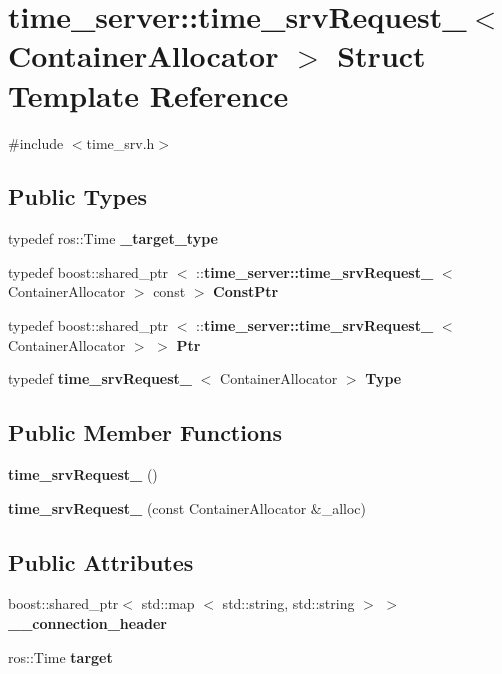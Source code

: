\section{time\-\_\-server\-:\-:time\-\_\-srv\-Request\-\_\-$<$ \-Container\-Allocator $>$ \-Struct \-Template \-Reference}
\label{structtime__server_1_1time__srvRequest__}


{\ttfamily \#include $<$time\-\_\-srv.\-h$>$}

\subsection*{\-Public \-Types}
\begin{DoxyCompactItemize}
\item 
typedef ros\-::\-Time {\bf \-\_\-target\-\_\-type}
\item 
typedef boost\-::shared\-\_\-ptr\*
$<$ \-::{\bf time\-\_\-server\-::time\-\_\-srv\-Request\-\_\-}\*
$<$ \-Container\-Allocator $>$ const  $>$ {\bf \-Const\-Ptr}
\item 
typedef boost\-::shared\-\_\-ptr\*
$<$ \-::{\bf time\-\_\-server\-::time\-\_\-srv\-Request\-\_\-}\*
$<$ \-Container\-Allocator $>$ $>$ {\bf \-Ptr}
\item 
typedef {\bf time\-\_\-srv\-Request\-\_\-}\*
$<$ \-Container\-Allocator $>$ {\bf \-Type}
\end{DoxyCompactItemize}
\subsection*{\-Public \-Member \-Functions}
\begin{DoxyCompactItemize}
\item 
{\bf time\-\_\-srv\-Request\-\_\-} ()
\item 
{\bf time\-\_\-srv\-Request\-\_\-} (const \-Container\-Allocator \&\-\_\-alloc)
\end{DoxyCompactItemize}
\subsection*{\-Public \-Attributes}
\begin{DoxyCompactItemize}
\item 
boost\-::shared\-\_\-ptr$<$ std\-::map\*
$<$ std\-::string, std\-::string $>$ $>$ {\bf \-\_\-\-\_\-connection\-\_\-header}
\item 
ros\-::\-Time {\bf target}
\end{DoxyCompactItemize}


